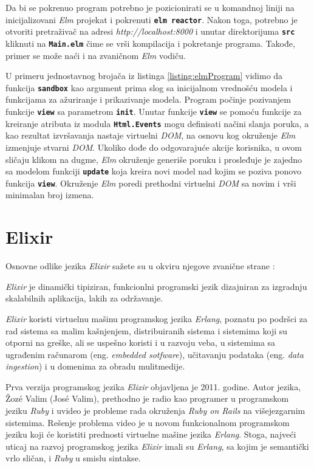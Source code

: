 \documentclass[12pt,oneside]{memoir}
\begin{document}
Da bi se pokrenuo program potrebno je pozicionirati se u komandnoj liniji na inicijalizovani
\emph{Elm} projekat i pokrenuti \texttt{\textbf{elm reactor}}. Nakon toga, potrebno je otvoriti pretraživač na
adresi \emph{http://localhost:8000} i unutar direktorijuma \texttt{\textbf{src}} kliknuti na 
\texttt{\textbf{Main.elm}} čime se vrši kompilacija i pokretanje programa. Takođe, primer se
može naći i na zvaničnom \emph{Elm} vodiču\cite{elm-program}.

U primeru jednostavnog brojača iz listinga \ref{listing:elmProgram} vidimo da funkcija
\textbf{\texttt{sandbox}} kao argument prima slog sa inicijalnom vrednošću modela i 
funkcijama za ažuriranje i prikazivanje modela. Program počinje pozivanjem funkcije
\texttt{\textbf{view}} sa parametrom \texttt{\textbf{init}}. Unutar funkcije
\texttt{\textbf{view}} se pomoću funkcije za kreiranje atributa iz modula
\texttt{\textbf{Html.Events}} mogu definisati načini slanja poruka, a kao rezultat 
izvršavanja nastaje virtuelni \emph{DOM}, na osnovu kog okruženje \emph{Elm} izmenjuje stvarni \emph{DOM}.
Ukoliko dođe do odgovarajuće akcije korisnika, u ovom sličaju klikom na dugme, \emph{Elm} okruženje
generiše poruku i prosleđuje je zajedno sa modelom funkciji \texttt{\textbf{update}} koja
kreira novi model nad kojim se poziva ponovo funkcija \texttt{\textbf{view}}.
Okruženje \emph{Elm} poredi prethodni virtuelni \emph{DOM} sa novim i vrši minimalan broj izmena.  

\chapter{Elixir}
Osnovne odlike jezika \emph{Elixir} sažete su u okviru njegove zvanične strane \cite{elixir}:
\begin{displayquote}
\emph{Elixir} je dinamički tipiziran, funkcionlni programski jezik dizajniran za izgradnju skalabilnih
aplikacija, lakih za održavanje.

\emph{Elixir} koristi virtuelnu mašinu programskog jezika \emph{Erlang}, poznatu po podršci za rad sistema sa malim kašnjenjem,
distribuiranih sistema i sistemima koji su otporni na greške, ali se uspešno koristi i u razvoju
veba, u sistemima sa ugrađenim računarom (eng. \emph{embedded sotfware}), učitavanju podataka
(eng. \emph{data ingestion}) i u domenima za obradu mulitmedije.
\end{displayquote}

Prva verzija programskog jezika \emph{Elixir} objavljena je 2011. godine. Autor jezika, Žozé Valim
(José Valim), prethodno je radio kao programer u programskom jeziku \emph{Ruby} i uvideo je probleme rada
okruženja \emph{Ruby on Rails} na višejezgarnim sistemima. Rešenje problema video je u novom funkcionalnom
programskom jeziku koji će koristiti prednosti virtuelne mašine jezika \emph{Erlang}. Stoga, najveći
uticaj na razvoj programskog jezika \emph{Elixir} imali su \emph{Erlang}, sa kojim je semantički vrlo sličan,
i \emph{Ruby} u smislu sintakse. 
\end{document}
